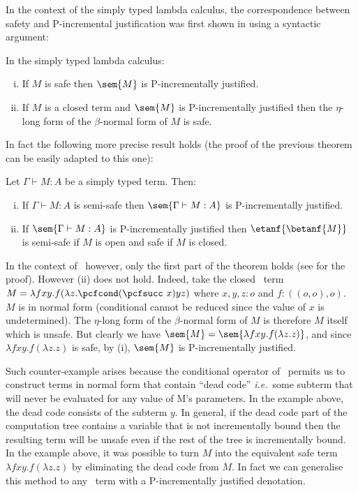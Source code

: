 In the context of the simply typed lambda calculus, the
correspondence between safety and P-incremental justification was
first shown in \cite[Theorem 3(ii)]{blumong:safelambdacalculus}
using a syntactic argument:
\begin{theorem}
\label{thm:safeincrejust}
 In the simply typed lambda calculus:
\begin{enumerate}[(i)]
\item If $M$ is safe then $\sem{M}$ is P-incrementally justified.
\item If $M$ is a closed term and $\sem{M}$ is
  P-incrementally justified then the $\eta$-long form of the
  $\beta$-normal form of $M$ is safe.
\end{enumerate}
\end{theorem}
In fact the following more precise result holds (the proof of the
previous theorem can be easily adapted to this one):
\begin{theorem}
\label{thm:semisafeincrejust} Let $\Gamma \vdash M : A$ be a simply typed term. Then:
\begin{enumerate}[(i)]
\item If $\Gamma \vdash M : A$ is semi-safe then $\sem{\Gamma \vdash M : A}$ is P-incrementally justified.
\item If $\sem{\Gamma \vdash M : A}$ is
  P-incrementally justified then
$\etanf{\betanf{M}}$ is semi-safe if $M$ is open
and safe if $M$ is closed.
\end{enumerate}
\end{theorem}



In the context of \pcf\ however, only the first part of the theorem
holds (see \cite{blumtransfer} for the proof). However (ii) does not
hold. Indeed, take the closed \pcf\ term $M = \lambda f x y. f
(\lambda z. \pcfcond (\pcfsucc\ x) y z )$ where $x,y,z:o$ and
$f:((o,o),o)$. $M$ is in normal form (conditional cannot be reduced
since the value of $x$ is undetermined). The $\eta$-long form of the
$\beta$-normal form of $M$ is therefore $M$ itself which is unsafe.
But clearly we have $\sem{M} = \sem{\lambda f x y. f (\lambda z.
z)}$, and since $\lambda f x y. f (\lambda z. z)$ is safe, by (i),
$\sem{M}$ is P-incrementally justified.

Such counter-example arises because the conditional operator of
\pcf\ permits us to construct terms in normal form that contain
``dead code'' {\it i.e.}~some subterm that will never be evaluated
for any value of M's parameters. In the example above, the dead code
consists of the subterm $y$. In general, if the dead code part of
the computation tree contains a variable that is not incrementally
bound then the resulting term will be unsafe even if the rest of the
tree is incrementally bound. In the example above, it was possible
to turn $M$ into the equivalent safe term $\lambda f x y. f (\lambda
z. z)$ by eliminating the dead code from $M$. In fact we can
generalise this method to any \pcf\ term with a P-incrementally
justified denotation.
\smallskip

